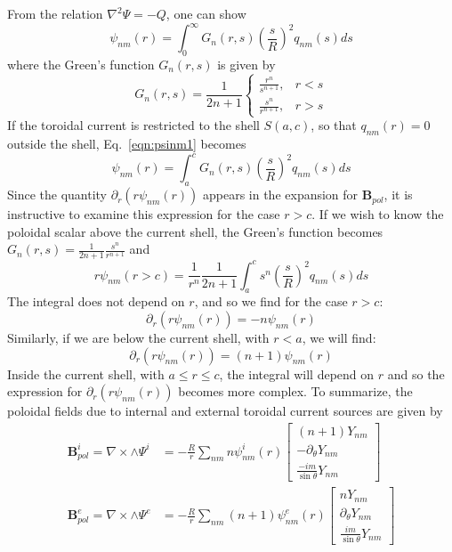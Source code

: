 \documentclass{article}
\newcommand{\B}{\mathbf{B}}
\begin{document}
From the relation $\nabla^2 \Psi = -Q$, one can show
\begin{equation}
\psi_{nm}(r) = \int_{0}^{\infty} G_n(r,s) \left( \frac{s}{R} \right)^2 q_{nm}(s) ds
\label{eqn:psinm1}
\end{equation}
where the Green's function $G_n(r,s)$ is given by
\begin{equation}
G_n(r,s) = \frac{1}{2n + 1}
\left\{
\begin{array}{cc}
\frac{r^n}{s^{n+1}}, & r < s \\
\frac{s^n}{r^{n+1}}, & r > s
\end{array}
\right.
\end{equation}
If the toroidal current is restricted to the shell $S(a,c)$, so that
$q_{nm}(r) = 0$ outside the shell, Eq.~\eqref{eqn:psinm1} becomes
\begin{equation}
\psi_{nm}(r) = \int_{a}^{c} G_n(r,s) \left( \frac{s}{R} \right)^2 q_{nm}(s) ds
\label{eqn:psinm2}
\end{equation}
Since the quantity $\partial_r (r \psi_{nm}(r))$ appears in
the expansion for $\B_{pol}$, it is instructive to examine this
expression for the case $r > c$. If we wish to know the poloidal
scalar above the current shell, the Green's function becomes
$G_n(r,s) = \frac{1}{2n+1} \frac{s^n}{r^{n+1}}$ and
\begin{equation}
r \psi_{nm}(r > c) = \frac{1}{r^n} \frac{1}{2n+1} \int_a^c s^n \left( \frac{s}{R} \right)^2 q_{nm}(s) ds
\label{eqn:psiabove}
\end{equation}
The integral does not depend on $r$, and so we find for the case $r > c$:
\begin{equation}
\partial_r (r \psi_{nm}(r)) = -n \psi_{nm}(r)
\label{eqn:psi_above}
\end{equation}
Similarly, if we are below the current shell, with $r < a$, we will find:
\begin{equation}
\partial_r (r \psi_{nm}(r)) = (n+1) \psi_{nm}(r)
\label{eqn:psi_below}
\end{equation}
Inside the current shell, with $a \le r \le c$, the integral will
depend on $r$ and so the expression for $\partial_r(r \psi_{nm}(r))$
becomes more complex. To summarize, the poloidal fields due to
internal and external toroidal current sources are given by
\begin{align}
\B_{pol}^i = \nabla \times \wedge \Psi^i &=
-\frac{R}{r} \sum_{nm} n \psi_{nm}^i(r)
\left[
\begin{array}{c}
(n+1) Y_{nm} \\
-\partial_{\theta} Y_{nm} \\
\frac{-im}{\sin{\theta}} Y_{nm}
\end{array}
\right] \label{eqn:Bpoli} \\
\B_{pol}^e = \nabla \times \wedge \Psi^e &=
-\frac{R}{r} \sum_{nm} (n+1) \psi_{nm}^e(r)
\left[
\begin{array}{c}
n Y_{nm} \\
\partial_{\theta} Y_{nm} \\
\frac{im}{\sin{\theta}} Y_{nm}
\end{array}
\right] \label{eqn:Bpole}
\end{align}
\end{document}
